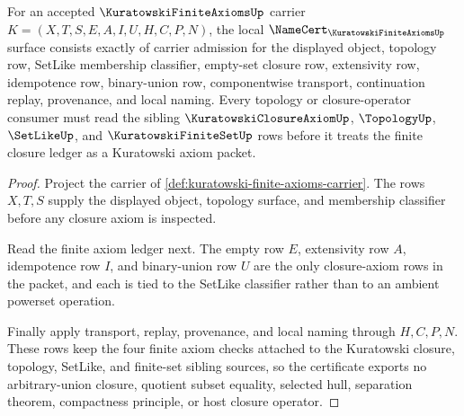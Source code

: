 \begin{theorem}
\label{thm:kuratowski-finite-axioms-namecert-obligations}
For an accepted $\KuratowskiFiniteAxiomsUp$ carrier $K=(X,T,S,E,A,I,U,H,C,P,N)$, the local $\NameCert_{\KuratowskiFiniteAxiomsUp}$ surface consists exactly of carrier admission for the displayed object, topology row, SetLike membership classifier, empty-set closure row, extensivity row, idempotence row, binary-union row, componentwise transport, continuation replay, provenance, and local naming. Every topology or closure-operator consumer must read the sibling $\KuratowskiClosureAxiomUp$, $\TopologyUp$, $\SetLikeUp$, and $\KuratowskiFiniteSetUp$ rows before it treats the finite closure ledger as a Kuratowski axiom packet.
\end{theorem}
\begin{proof}
Project the carrier of \autoref{def:kuratowski-finite-axioms-carrier}. The rows $X,T,S$ supply the displayed object, topology surface, and membership classifier before any closure axiom is inspected.

Read the finite axiom ledger next. The empty row $E$, extensivity row $A$, idempotence row $I$, and binary-union row $U$ are the only closure-axiom rows in the packet, and each is tied to the SetLike classifier rather than to an ambient powerset operation.

Finally apply transport, replay, provenance, and local naming through $H,C,P,N$. These rows keep the four finite axiom checks attached to the Kuratowski closure, topology, SetLike, and finite-set sibling sources, so the certificate exports no arbitrary-union closure, quotient subset equality, selected hull, separation theorem, compactness principle, or host closure operator.
\end{proof}

